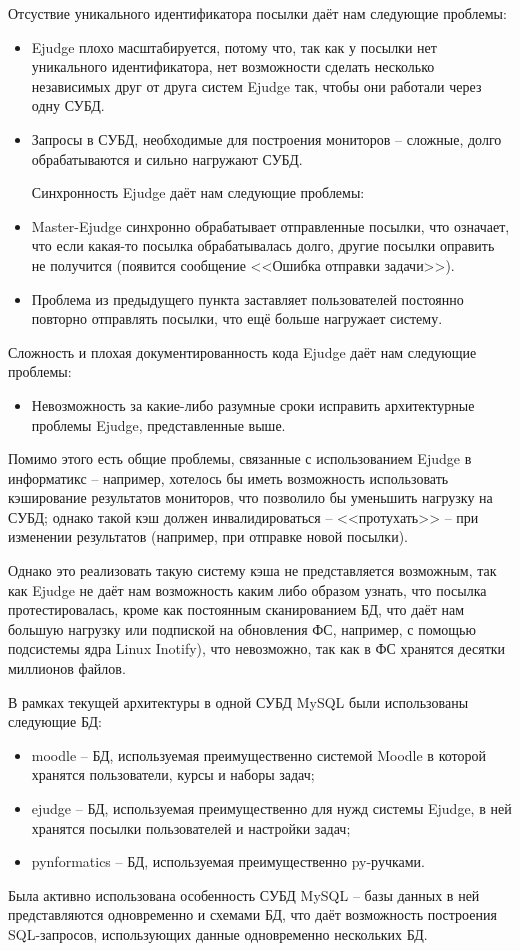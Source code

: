Отсуствие уникального идентификатора посылки даёт нам следующие проблемы:

\begin{itemize}
    \item Ejudge плохо масштабируется, потому что, так как у посылки нет уникального идентификатора, 
нет возможности сделать несколько независимых друг от друга систем Ejudge так, чтобы они работали через одну СУБД.
    \item Запросы в СУБД, необходимые для построения мониторов -- сложные, долго обрабатываются и сильно нагружают СУБД.

Синхронность Ejudge даёт нам следующие проблемы:

    \item Master-Ejudge синхронно обрабатывает отправленные посылки, что означает, что 
если какая-то посылка обрабатывалась долго, другие посылки оправить не получится
(появится сообщение <<Ошибка отправки задачи>>).
    \item Проблема из предыдущего пункта заставляет пользователей постоянно повторно отправлять посылки, что ещё больше нагружает систему.
\end{itemize}

Сложность и плохая документированность кода Ejudge даёт нам следующие проблемы:
\begin{itemize}
    \item Невозможность за какие-либо разумные сроки исправить архитектурные проблемы Ejudge, представленные выше.
\end{itemize}

Помимо этого есть общие проблемы, связанные с использованием Ejudge в информатикс -- например, 
хотелось бы иметь возможность использовать кэширование результатов мониторов, что позволило бы уменьшить нагрузку на СУБД;
однако такой кэш должен инвалидироваться -- <<протухать>> -- при изменении результатов (например, при отправке новой посылки).

Однако это реализовать такую систему кэша не представляется возможным, 
так как Ejudge не даёт нам возможность каким либо образом узнать, что посылка протестировалась, 
кроме как постоянным сканированием БД, что даёт нам большую нагрузку
или подпиской на обновления ФС, например, с помощью подсистемы ядра Linux Inotify), \label{chap:inotify}
что невозможно, так как в ФС хранятся десятки миллионов файлов\cite{many_files}.

В рамках текущей архитектуры в одной СУБД MySQL были использованы следующие БД:
\begin{itemize}
    \item moodle -- БД, используемая преимущественно системой Moodle в которой хранятся пользователи, курсы и наборы задач;
    \item ejudge -- БД, используемая преимущественно для нужд системы Ejudge, в ней хранятся посылки пользователей и настройки задач;
    \item pynformatics -- БД, используемая преимущественно py-ручками.
\end{itemize}
Была активно использована особенность СУБД MySQL -- базы данных в ней представляются одновременно и схемами БД, 
что даёт возможность построения SQL-запросов, использующих данные одновременно нескольких БД.

